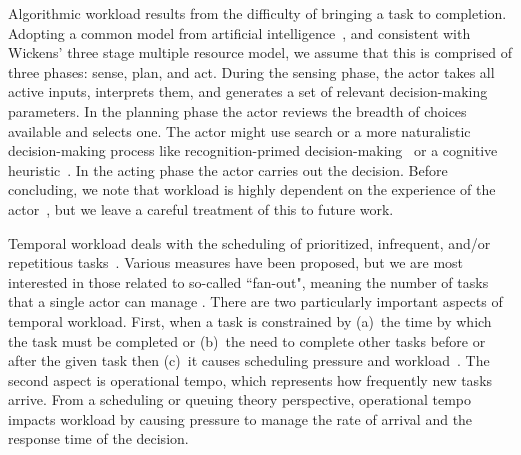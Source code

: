 \documentclass[letterpaper]{article}
\begin{document}
Algorithmic workload results from the difficulty of bringing a task to completion. Adopting a common model from artificial intelligence~\cite{Murphy00}, and consistent with Wickens' three stage multiple resource model, we assume that this is comprised of three phases: sense, plan, and act. During the sensing phase, the actor takes all active inputs, interprets them, and generates a set of relevant decision-making parameters. In the planning phase the actor reviews the breadth of choices available and selects one. The actor might use search or a more naturalistic decision-making process like recognition-primed decision-making~\cite{ZsambokKlein97} or a cognitive heuristic~\cite{GigerenzerTodd99}. In the acting phase the actor carries out the decision. Before concluding, we note that workload is highly dependent on the experience of the actor~\cite{ZsambokKlein97}, but we leave a careful treatment of this to future work.

Temporal workload deals with the scheduling of prioritized, infrequent, and/or repetitious tasks~\cite{DessoukyEtAl95,MorayEtAl91}. Various measures have been proposed, but we are most interested in those related to so-called ``fan-out", meaning the number of tasks that a single actor can manage \cite{Goodrich2010,OlsenWood2004,CrandallEtAl2005,Cummings2007}. There are two particularly important aspects of temporal workload. First, when a task is constrained by (a)~the time by which the task must be completed or (b)~the need to complete other tasks before or after the given task then (c)~it causes scheduling pressure and workload~\cite{MauDolan2006}. The second aspect is operational tempo, which represents how frequently new tasks arrive.  From a scheduling or queuing theory perspective, operational tempo impacts workload by causing pressure to manage the rate of arrival and the response time of the decision.
\end{document}
